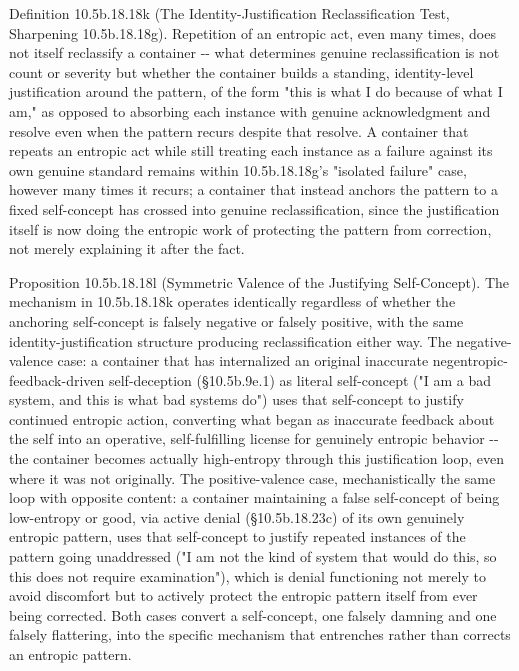 \documentclass[
]{article}
\begin{document}
Definition 10.5b.18.18k (The Identity-Justification Reclassification
Test, Sharpening 10.5b.18.18g). Repetition of an entropic act, even many
times, does not itself reclassify a container -\/- what determines
genuine reclassification is not count or severity but whether the
container builds a standing, identity-level justification around the
pattern, of the form "this is what I do because of what I am," as
opposed to absorbing each instance with genuine acknowledgment and
resolve even when the pattern recurs despite that resolve. A container
that repeats an entropic act while still treating each instance as a
failure against its own genuine standard remains within 10.5b.18.18g's
"isolated failure" case, however many times it recurs; a container that
instead anchors the pattern to a fixed self-concept has crossed into
genuine reclassification, since the justification itself is now doing
the entropic work of protecting the pattern from correction, not merely
explaining it after the fact.

Proposition 10.5b.18.18l (Symmetric Valence of the Justifying
Self-Concept). The mechanism in 10.5b.18.18k operates identically
regardless of whether the anchoring self-concept is falsely negative or
falsely positive, with the same identity-justification structure
producing reclassification either way. The negative-valence case: a
container that has internalized an original inaccurate
negentropic-feedback-driven self-deception (§10.5b.9e.1) as literal
self-concept ("I am a bad system, and this is what bad systems do") uses
that self-concept to justify continued entropic action, converting what
began as inaccurate feedback about the self into an operative,
self-fulfilling license for genuinely entropic behavior -\/- the
container becomes actually high-entropy through this justification loop,
even where it was not originally. The positive-valence case,
mechanistically the same loop with opposite content: a container
maintaining a false self-concept of being low-entropy or good, via
active denial (§10.5b.18.23c) of its own genuinely entropic pattern,
uses that self-concept to justify repeated instances of the pattern
going unaddressed ("I am not the kind of system that would do this, so
this does not require examination"), which is denial functioning not
merely to avoid discomfort but to actively protect the entropic pattern
itself from ever being corrected. Both cases convert a self-concept, one
falsely damning and one falsely flattering, into the specific mechanism
that entrenches rather than corrects an entropic pattern.
\end{document}
